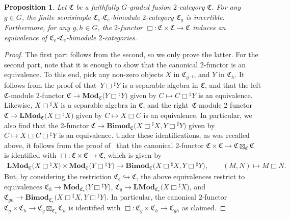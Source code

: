 \documentclass[pdftex]{sigma}
\newtheorem{Proposition}[Theorem]{Proposition}
{ \theoremstyle{definition}
\newtheorem{Definition}[Theorem]{Definition}
\newtheorem{Note}[Theorem]{Note}
\newtheorem{Construction}[Theorem]{Construction}
\newtheorem{Example}[Theorem]{Example}
\newtheorem{Remark}[Theorem]{Remark} }
\numberwithin{equation}{section}
\begin{document}
\begin{Proposition}\label{prop:gradedMoritaequivalence}
Let $\mathfrak{C}$ be a faithfully $G$-graded fusion $2$-category $\mathfrak{C}$. For any $g\in G$, the finite semisimple $\mathfrak{C}_e$-$\mathfrak{C}_e$-bimodule $2$-category $\mathfrak{C}_g$ is invertible. Furthermore, for any $g,h\in G$, the $2$-functor $\Box\colon\mathfrak{C}\times\mathfrak{C}\rightarrow \mathfrak{C}$ induces an equivalence  of $\mathfrak{C}_e$-$\mathfrak{C}_e$-bimodule $2$-categories.
\end{Proposition}
\begin{proof}
The first part follows from the second, so we only prove the latter. For the second part, note that it is enough to show that the canonical 2-functor is an equivalence. To this end, pick any non-zero objects $X$ in $\mathfrak{C}_{g^{-1}}$, and $Y$ in $\mathfrak{C}_{h}$. It follows from the proof of \cite[Theorem~5.4.3]{D8} that~$Y\Box {^{\sharp}Y}$ is a separable algebra in $\mathfrak{C}$, and that the left $\mathfrak{C}$-module 2-functor $\mathfrak{C}\rightarrow \mathbf{Mod}_{\mathfrak{C}}\big(Y\Box {^{\sharp}Y}\big)$ given by $C\mapsto C\Box {^{\sharp}Y}$ is an equivalence. Likewise, $X\Box {^{\sharp}X}$ is a separable algebra in $\mathfrak{C}$, and the right~$\mathfrak{C}$-module 2-functor $\mathfrak{C}\rightarrow \mathbf{LMod}_{\mathfrak{C}}\big(X\Box {^{\sharp}X}\big)$ given by $C\mapsto X\Box C$ is an equivalence. In particular, we also find that the 2-functor $\mathfrak{C}\rightarrow \mathbf{Bimod}_{\mathfrak{C}}\big(X\Box {^{\sharp}X},Y\Box {^{\sharp}Y}\big)$ given by $C\mapsto X\Box C\Box {^{\sharp}Y}$ is an equivalence. Under these identifications, as was recalled above, it follows from the proof of~\cite[Theorem~2.2.4]{D10} that the canonical 2-functor $\mathfrak{C}\times\mathfrak{C}\rightarrow\mathfrak{C}\boxtimes_{\mathfrak{C}}\mathfrak{C}$ is identified with $\Box\colon\mathfrak{C}\times\mathfrak{C}\rightarrow \mathfrak{C}$, which is given by
\begin{gather*}
 \mathbf{LMod}_{\mathfrak{C}}\big(X\Box {^{\sharp}X}\big)\times\mathbf{Mod}_{\mathfrak{C}}\big(Y\Box {^{\sharp}Y}\big) \rightarrow \mathbf{Bimod}_{\mathfrak{C}}\big(X\Box {^{\sharp}X},Y\Box {^{\sharp}Y}\big),\qquad
(M,N) \mapsto M\Box N.
\end{gather*}
 But, by considering the restriction $\mathfrak{C}_e\hookrightarrow\mathfrak{C}$, the above equivalences restrict to equivalences $\mathfrak{C}_h\rightarrow \mathbf{Mod}_{\mathfrak{C}_e}\big(Y\Box {^{\sharp}Y}\big)$, $\mathfrak{C}_g\rightarrow \mathbf{LMod}_{\mathfrak{C}_e}\big(X\Box {^{\sharp}X}\big)$, and $\mathfrak{C}_{gh}\rightarrow \mathbf{Bimod}_{\mathfrak{C}_e}\big(X\Box {^{\sharp}X},Y\Box {^{\sharp}Y}\big)$. In particular, the canonical 2-functor $\mathfrak{C}_g\times\mathfrak{C}_h\rightarrow\mathfrak{C}_g\boxtimes_{\mathfrak{C}_e}\mathfrak{C}_h$ is identified with $\Box:\mathfrak{C}_g\times\mathfrak{C}_h\rightarrow\mathfrak{C}_{gh}$ as claimed.
\end{proof}
\end{document}
